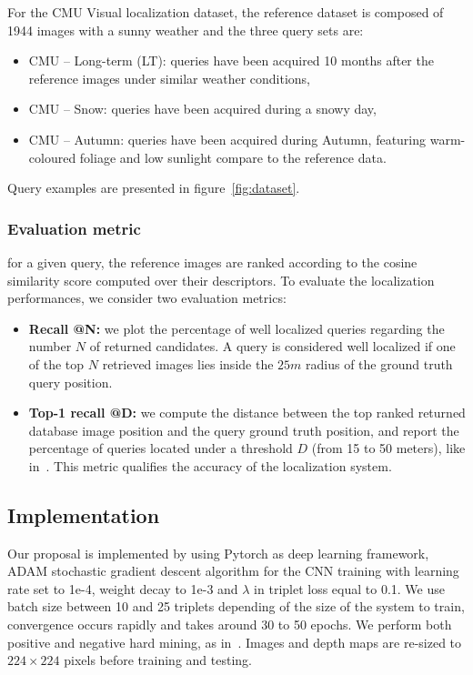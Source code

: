 For the CMU Visual localization dataset, the reference dataset is composed of 1944 images with a sunny weather and the three query sets are:
\begin{itemize}
	\item {CMU -- Long-term (LT):} queries have been acquired 10 months after the reference images under similar weather conditions,
	\item {CMU -- Snow:} queries have been acquired during a snowy day,
	\item {CMU -- Autumn:} queries have been acquired during Autumn, featuring warm-coloured foliage and low sunlight compare to the reference data.
\end{itemize}

\noindent Query examples are presented in figure~\ref{fig:dataset}.
	
\subsubsection{Evaluation metric}
for a given query, the reference images are ranked according to the cosine similarity score computed over their descriptors. To evaluate the localization performances, we consider two evaluation metrics:
\begin{itemize}
	\item \textbf{Recall @N:} we plot the percentage of well localized queries regarding the number $N$ of returned candidates. A query is considered well localized if one of the top $N$ retrieved images lies inside the $25m$ radius of the ground truth query position.
	\item \textbf{Top-1 recall @D:} we compute the distance between the top ranked returned database image position and the query ground truth position, and report the percentage of queries located under a threshold $D$ (from 15 to 50 meters), like in~\cite{Zamir2014}. This metric qualifies the accuracy of the localization system.
\end{itemize}


\subsection{Implementation}
\label{subsec:implementation}

Our proposal is implemented by using Pytorch as deep learning framework, ADAM stochastic gradient descent algorithm for the CNN training with learning rate set to 1e-4, weight decay to 1e-3 and $\lambda$ in triplet loss equal to 0.1. We use batch size between 10 and 25 triplets depending of the size of the system to train, convergence occurs rapidly and takes around 30 to 50 epochs. We perform both positive and negative hard mining, as in~\cite{Radenovic2017}. Images and depth maps are re-sized to $224\times224$ pixels before training and testing.

